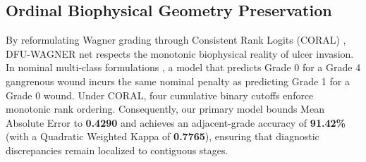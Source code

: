 \documentclass[journal]{IEEEtran}
\begin{document}
\subsection{Ordinal Biophysical Geometry Preservation}
By reformulating Wagner grading through Consistent Rank Logits (CORAL) \cite{cao2020rank}, DFU-WAGNER net respects the monotonic biophysical reality of ulcer invasion. In nominal multi-class formulations \cite{rostami2024deep, zhou2025deep}, a model that predicts Grade 0 for a Grade 4 gangrenous wound incurs the same nominal penalty as predicting Grade 1 for a Grade 0 wound. Under CORAL, four cumulative binary cutoffs enforce monotonic rank ordering. Consequently, our primary model bounds Mean Absolute Error to \textbf{0.4290} and achieves an adjacent-grade accuracy of \textbf{91.42\%} (with a Quadratic Weighted Kappa of \textbf{0.7765}), ensuring that diagnostic discrepancies remain localized to contiguous stages.

\end{document}
